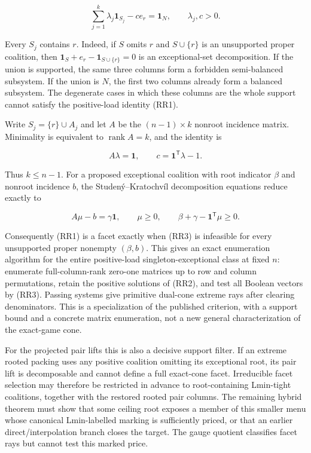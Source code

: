 \documentclass[11pt]{article}
\newcommand{\one}{\mathbf 1}
\begin{document}
\[
 \sum_{j=1}^k\lambda_j\one_{S_j}-c e_r=\one_N,
 \qquad \lambda_j,c>0.                               \tag{RR1}
\]

Every $S_j$ contains $r$.  Indeed, if $S$ omits $r$ and
$S\cup\{r\}$ is an unsupported proper coalition, then
$\one_S+e_r-\one_{S\cup\{r\}}=0$ is an exceptional-set decomposition.  If
the union is supported, the same three columns form a forbidden
semi-balanced subsystem.  If the union is $N$, the first two columns already
form a balanced subsystem.  The degenerate cases in which these columns are
the whole support cannot satisfy the positive-load identity (RR1).

Write $S_j=\{r\}\cup A_j$ and let $A$ be the $(n-1)\times k$ nonroot
incidence matrix.  Minimality is equivalent to $\operatorname{rank}A=k$, and the identity
is

\[
 A\lambda=\one,\qquad c=\one^\mathsf T\lambda-1.     \tag{RR2}
\]

Thus $k\le n-1$.  For a proposed exceptional coalition with root indicator
$\beta$ and nonroot incidence $b$, the Studen\'y--Kratochv\'il decomposition
equations reduce exactly to

\[
 A\mu-b=\gamma\one,\qquad
 \mu\ge0,\qquad \beta+\gamma-\one^\mathsf T\mu\ge0. \tag{RR3}
\]

Consequently (RR1) is a facet exactly when (RR3) is infeasible for every
unsupported proper nonempty $(\beta,b)$.  This gives an exact enumeration
algorithm for the entire positive-load singleton-exceptional class at fixed
$n$: enumerate full-column-rank zero-one matrices up to row and column
permutations, retain the positive solutions of (RR2), and test all Boolean
vectors by (RR3).  Passing systems give primitive dual-cone extreme rays
after clearing denominators.  This is a specialization of the published
criterion, with a support bound and a concrete matrix enumeration, not a new
general characterization of the exact-game cone.

For the projected pair lifts this is also a decisive support filter.  If an
extreme rooted packing uses any positive coalition omitting its exceptional
root, its pair lift is decomposable and cannot define a full exact-cone
facet.  Irreducible facet selection may therefore be restricted in advance
to root-containing Lmin-tight coalitions, together with the restored rooted
pair columns.  The remaining hybrid theorem must show that some ceiling root
exposes a member of this smaller menu whose canonical Lmin-labelled marking
is sufficiently priced, or that an earlier direct/interpolation branch
closes the target.  The gauge quotient classifies facet rays but cannot test
this marked price.
\end{document}
